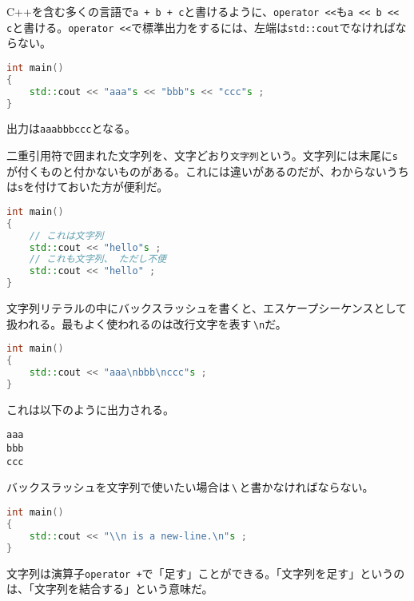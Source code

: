 C++を含む多くの言語で\texttt{a + b + c}と書けるように、\texttt{operator {<}{<}}も\texttt{a {<}{<} b {<}{<} c}と書ける。\texttt{operator {<}{<}}で標準出力をするには、左端は\texttt{std::cout}でなければならない。

\begin{lstlisting}[language={C++}]
int main()
{
    std::cout << "aaa"s << "bbb"s << "ccc"s ;
}
\end{lstlisting}

出力は\texttt{aaabbbccc}となる。

\clearpage
{}

二重引用符で囲まれた文字列を、文字どおり\texttt{文字列}という。文字列には末尾に\texttt{s}が付くものと付かないものがある。これには違いがあるのだが、わからないうちは\texttt{s}を付けておいた方が便利だ。

\begin{lstlisting}[language={C++}]
int main()
{
    // これは文字列
    std::cout << "hello"s ;
    // これも文字列、 ただし不便
    std::cout << "hello" ;
}
\end{lstlisting}

文字列リテラルの中にバックスラッシュを書くと、エスケープシーケンスとして扱われる。最もよく使われるのは改行文字を表す\,\texttt{{\textbackslash}n}だ。

\begin{lstlisting}[language={C++}]
int main()
{
    std::cout << "aaa\nbbb\nccc"s ;
}
\end{lstlisting}

これは以下のように出力される。

\begin{lstlisting}[style=terminal]
aaa
bbb
ccc
\end{lstlisting}

バックスラッシュを文字列で使いたい場合は\,\texttt{{\textbackslash}}\,と書かなければならない。

\begin{lstlisting}[language={C++}]
int main()
{
    std::cout << "\\n is a new-line.\n"s ;
}
\end{lstlisting}

文字列は演算子\texttt{operator +}で「足す」ことができる。「文字列を足す」というのは、「文字列を結合する」という意味だ。

